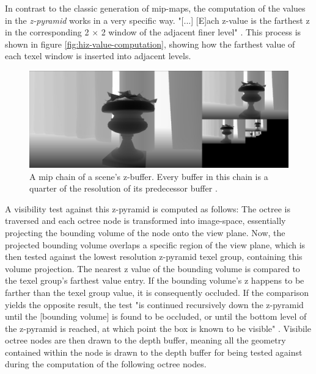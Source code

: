 \noindent
In contrast to the classic generation of mip-maps, the computation of the values in the \emph{z-pyramid} works in a 
very specific way. "[...] [E]ach z-value is the farthest z in the corresponding 2 \begin{math}\times\end{math} 2 window 
of the adjacent finer level" \cite{AkenineMoeller2018}. This process is shown in figure \ref{fig:hiz-value-computation}, 
showing how the farthest value of each texel window is inserted into adjacent levels.\\

\begin{figure}[h]
    \centering
    \includegraphics[width=\linewidth]{images/graphics/hiz-mip-chain.jpg}
    \caption{A mip chain of a scene's z-buffer. Every buffer in this chain is a quarter of the resolution of its 
    predecessor buffer \cite{Schachtschabel2017}.}
    \label{fig:hiz-mip-chain}
\end{figure}

\noindent
A visibility test against this z-pyramid is computed as follows: The octree is traversed and each octree node 
is transformed into image-space, essentially projecting the bounding volume of the node onto the view plane. Now, 
the projected bounding volume overlaps a specific region of the view plane, which is then tested against the lowest 
resolution z-pyramid texel group, containing this volume projection. The nearest z value of the bounding volume is 
compared to the texel group's farthest value entry. If the bounding volume's z happens to be farther than the 
texel group value, it is consequently occluded. If the comparison yields the opposite result, the test "is continued 
recursively down the z-pyramid until the [bounding volume] is found to be occluded, or until the bottom level of the 
z-pyramid is reached, at which point the box is known to be visible" \cite{AkenineMoeller2018}. Visibile octree nodes 
are then drawn to the depth buffer, meaning all the geometry contained within the node is drawn to the depth buffer 
for being tested against during the computation of the following octree nodes.\\

